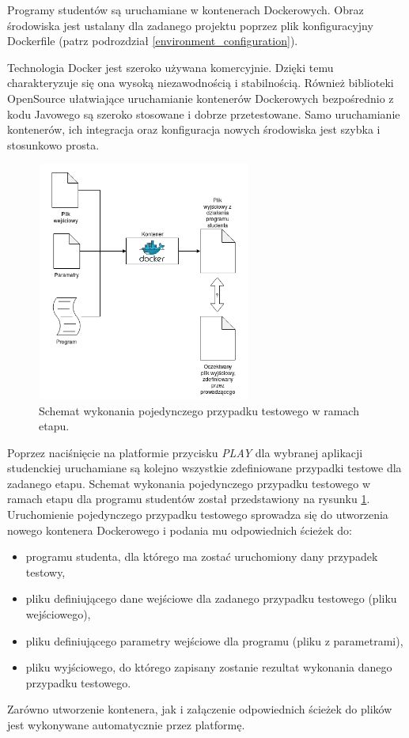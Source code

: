 Programy studentów są uruchamiane w kontenerach Dockerowych.
Obraz środowiska jest ustalany dla zadanego projektu poprzez plik konfiguracyjny Dockerfile (patrz podrozdział \ref{environment_configuration}).

Technologia Docker jest szeroko używana komercyjnie.
Dzięki temu charakteryzuje się ona wysoką niezawodnością i stabilnością.
Również biblioteki OpenSource ułatwiające uruchamianie kontenerów Dockerowych bezpośrednio z kodu Javowego są szeroko stosowane i dobrze przetestowane.
Samo uruchamianie kontenerów, ich integracja oraz konfiguracja nowych środowiska jest szybka i stosunkowo prosta.

\begin{figure}[h]
    \centering
    \includegraphics[width = 7cm]{chapter05/single_test_case.png}
    \caption{Schemat wykonania pojedynczego przypadku testowego w ramach etapu.}
    \label{fig:single-test-case}
\end{figure}

Poprzez naciśnięcie na platformie przycisku \textit{PLAY} dla wybranej aplikacji studenckiej uruchamiane są kolejno wszystkie zdefiniowane przypadki testowe dla zadanego etapu.
Schemat wykonania pojedynczego przypadku testowego w ramach etapu dla programu studentów został przedstawiony na rysunku \ref{fig:single-test-case}.
Uruchomienie pojedynczego przypadku testowego sprowadza się do utworzenia nowego kontenera Dockerowego i podania mu odpowiednich ścieżek do:
\begin{itemize}
    \item programu studenta, dla którego ma zostać uruchomiony dany przypadek testowy,
    \item pliku definiującego dane wejściowe dla zadanego przypadku testowego (pliku wejściowego),
    \item pliku definiującego parametry wejściowe dla programu (pliku z parametrami),
    \item pliku wyjściowego, do którego zapisany zostanie rezultat wykonania danego przypadku testowego.
\end{itemize}
Zarówno utworzenie kontenera, jak i załączenie odpowiednich ścieżek do plików jest wykonywane automatycznie przez platformę.

